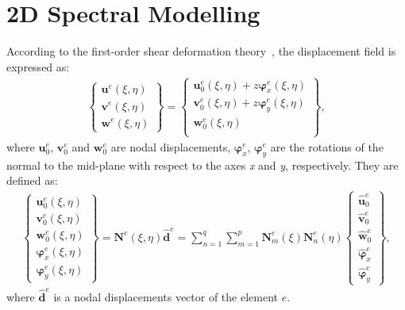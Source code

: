 \section{2D Spectral Modelling}
\label{sec:2Dmodel}


According to the first-order shear deformation theory~\cite{reissner1945effect, mindlin1951influence}, the displacement field is expressed as:
\begin{eqnarray}
	\left \{ \begin{array}{c}
		\textbf{u}^e(\xi,\eta) \\
		\textbf{v}^e(\xi,\eta) \\
		\textbf{w}^e(\xi,\eta)
	\end{array} \right\} = 
	\left \{ \begin{array}{c}
		\textbf{u}_0^e(\xi,\eta) + z\boldsymbol{\varphi}_x^e(\xi,\eta)\\
		\textbf{v}_0^e(\xi,\eta) + z\boldsymbol{\varphi}_y^e(\xi,\eta)\\
		\textbf{w}_0^e(\xi,\eta) \\
	\end{array} \right\},
\end{eqnarray}
where \(\textbf{u}_0^e\), \(\textbf{v}_0^e\) and \(\textbf{w}_0^e\) are nodal displacements, \(\boldsymbol{\varphi}_x^e\), \(\boldsymbol{\varphi}_y^e\) are the rotations of the normal to the mid-plane with respect to the axes \textit{x} and \textit{y}, respectively. They are defined as:
\begin{eqnarray}
	\left \{\begin{array}{c}
		\textbf{u}_0^e(\xi,\eta) \\
		\textbf{v}_0^e(\xi,\eta) \\
		\textbf{w}_0^e(\xi,\eta) \\
		\boldsymbol{\varphi}_x^e(\xi,\eta) \\
		\boldsymbol{\varphi}_y^e(\xi,\eta)
	\end{array} \right\}
	= \textbf{N}^e(\xi,\eta)\widehat{\textbf{d}}^e
	= \sum_{n=1}^q\sum_{m=1}^p\textbf{N}_m^e(\xi)\textbf{N}_n^e(\eta)
	\left \{ \begin{array}{c}
		\widehat{\textbf{u}}_0^e \\
		\widehat{\textbf{v}}_0^e \\
		\widehat{\textbf{w}}_0^e \\
		\widehat{\boldsymbol{\varphi}}_x^e \\
		\widehat{\boldsymbol{\varphi}}_y^e
	\end{array} \right \},
\end{eqnarray}
where $\widehat{\textbf{d}}^e$ is a nodal displacements vector of the element $e$.

